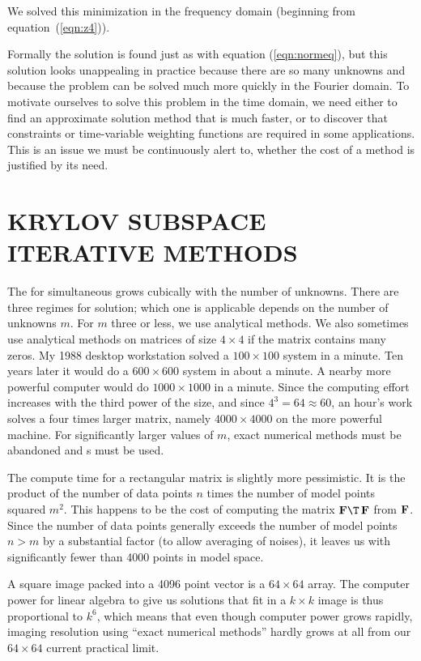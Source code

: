 We solved this minimization
in the frequency domain
(beginning from equation~(\ref{eqn:z4})).
\par
Formally the solution is found just as with equation (\ref{eqn:normeq}),
but this solution looks unappealing in practice
because there are so many unknowns and because
the problem can be solved much more quickly
in the Fourier domain.
To motivate ourselves to solve this problem in the time domain,
we need either to find an approximate solution method that is
much faster, or to discover that
constraints or time-variable weighting functions
are required in some applications.
This is an issue we must be continuously alert to,
whether the cost of a method is justified by its need.



\section{KRYLOV SUBSPACE ITERATIVE METHODS}
The  for simultaneous 
grows cubically with the number of unknowns.
There are three regimes for solution;
which one is applicable
depends on the number of unknowns $m$.
For $m$ three or less, we use analytical methods.
We also sometimes use analytical methods on matrices of size $4\times 4$
if the matrix contains many zeros.
My 1988 desktop workstation solved a $100 \times 100$
system in a minute.
Ten years later it would do a $600\times 600$ system in about a minute.
A nearby more powerful computer would do
$1000\times 1000$ in a minute.
Since the computing effort increases with the third power of the size,
and since $4^3=64\approx 60$,
an hour's work solves a four times larger matrix,
namely $4000\times 4000$ on the more powerful machine.
For significantly larger values of $m$,
exact numerical methods must be abandoned
and s must be used.
\par
The compute time for a rectangular matrix is slightly more pessimistic.
It is the product of the number of data points $n$
times the number of model points squared $m^2$.
This happens to be the cost of computing the matrix
$\bold F\T\,\bold F$ from $\bold F$.
Since the number of data points generally exceeds the number of model
points $n>m$ by a substantial factor
(to allow averaging of noises),
it leaves us with significantly fewer than 4000 points in model space.
\par
A square image packed into a 4096 point vector is a $64\times 64$ array.
The computer power for linear algebra to give us solutions that
fit in a $k\times k$ image is thus proportional
to $k^6$, which means that even though computer power grows rapidly,
imaging resolution using ``exact numerical methods'' hardly
grows at all from our $64\times 64$ current practical limit.

